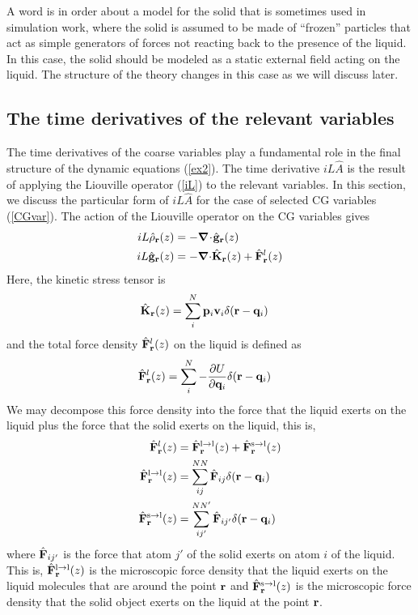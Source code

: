 \documentclass[b5paper,openright,10pt]{book}
\newcommand{\esc}{\!\cdot\!}
\begin{document}
A word is in order about a  model for the solid that is sometimes used
in  simulation work,  where the  solid  is  assumed to  be made  of
``frozen''  particles that  act  as simple  generators  of forces  not
reacting back  to the presence of  the liquid. In this  case, the solid
should be modeled as a static external field acting on the liquid. The
structure of the theory changes in this case as we will discuss later. 

\subsection{The time derivatives of the relevant variables}
The time derivatives  of the coarse variables play  a fundamental role
in the final structure of  the dynamic equations (\ref{ex2}). The time
derivative $  iL\hat{A}$ is  the result of  applying the  Liouville operator
(\ref{iL}) to the relevant variables.  In this section, we discuss the
particular  form of  $  iL\hat{A}$ for  the case  of  selected CG  variables
(\ref{CGvar}). The action of the Liouville operator on the CG variables gives \cite{Espanol2015a}
\begin{align}
    iL \hat{\rho}_{\bf r}(z) &= -\boldsymbol{\nabla}\esc\hat{\bf g}_{\bf r}(z)
\nonumber\\
iL  \hat{\bf g}_{\bf r}(z) &= -\boldsymbol{\nabla}{\cdot} \hat{{\bf K}}_{\bf r}(z)+
\hat{\bf F}^l_{\bf r}(z)
\label{ildens}
\end{align}
Here, the kinetic stress tensor is 
\begin{align}
  \hat{{\bf K}}_{\bf r}(z) &=\sum^{N}_i{\bf p}_i{\bf v}_i
\delta({\bf r}-{\bf q}_i)
\end{align}
and the total  force density $\hat{\bf F}^l_{\bf r}(z)$  on the liquid
is defined as
\begin{align}
  \hat{\bf F}^l_{\bf r}(z) &
=\sum_i^N-\frac{\partial U}{\partial {\bf q}_i}\delta({\bf r}-{\bf q}_i)
\label{Frtot}
\end{align}
We may decompose  this force density into the
force that  the liquid exerts on  the liquid plus the  force that the
solid   exerts  on  the   liquid,  this   is,  
\begin{align}
   \hat{\bf  F}^l_{\bf
  r}(z)&=\hat{\bf  F}^{\rm l\to  l}_{\bf r}(z)  +\hat{\bf  F}^{\rm s\to
  l}_{\bf r}(z) 
\nonumber\\
\hat{\bf F}^{\rm l\to l}_{\bf r}(z) &= \sum^{NN}_{ij}\hat{\bf F}_{ij}\delta({\bf r}-{\bf q}_i)
\nonumber\\
\hat{\bf F}^{\rm s\to l}_{\bf r}(z) &= \sum^{NN'}_{ij'}\hat{\bf F}_{ij'}\delta({\bf r}-{\bf q}_i)
\label{Fr}
\end{align}
where $\hat{\bf F}_{ij'}$ is the force  that atom $j'$ of the solid
exerts on  atom $i$ of  the liquid.   This is, $\hat{\bf  F}^{\rm l\to
  l}_{\bf r}(z)  $ is  the microscopic force  density that  the liquid
exerts on the liquid molecules that are around the point ${\bf r}$ and
$\hat{\bf F}^{\rm s\to l}_{\bf r}(z)$ is the microscopic force density
that the solid object exerts on the liquid at the point ${\bf r}$.
\end{document}
